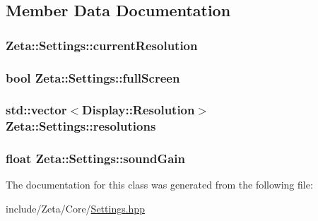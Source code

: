 \subsection{Member Data Documentation}
\hypertarget{classZeta_1_1Settings_a48d7642ab9f41200a04b8fa87df6bd21}{
\subsubsection[{current\+Resolution}]{ Zeta\+::\+Settings\+::current\+Resolution\hspace{0.3cm}{\ttfamily [private]}}}\label{classZeta_1_1Settings_a48d7642ab9f41200a04b8fa87df6bd21}
\hypertarget{classZeta_1_1Settings_a9ab00f9bfa9b51a82e362109c7c98809}{
\subsubsection[{full\+Screen}]{\setlength{\rightskip}{0pt plus 5cm}bool Zeta\+::\+Settings\+::full\+Screen\hspace{0.3cm}{\ttfamily [private]}}}\label{classZeta_1_1Settings_a9ab00f9bfa9b51a82e362109c7c98809}
\hypertarget{classZeta_1_1Settings_a4edd784ac3f38ad781dc214ad776e87e}{
\subsubsection[{resolutions}]{\setlength{\rightskip}{0pt plus 5cm}std\+::vector$<${\bf Display\+::\+Resolution}$>$ Zeta\+::\+Settings\+::resolutions\hspace{0.3cm}{\ttfamily [private]}}}\label{classZeta_1_1Settings_a4edd784ac3f38ad781dc214ad776e87e}
\hypertarget{classZeta_1_1Settings_a32644610eb7d398eb5b679937bd270b3}{
\subsubsection[{sound\+Gain}]{\setlength{\rightskip}{0pt plus 5cm}float Zeta\+::\+Settings\+::sound\+Gain\hspace{0.3cm}{\ttfamily [private]}}}\label{classZeta_1_1Settings_a32644610eb7d398eb5b679937bd270b3}


The documentation for this class was generated from the following file\+:\begin{DoxyCompactItemize}
\item 
include/\+Zeta/\+Core/\hyperlink{Settings_8hpp}{Settings.\+hpp}\end{DoxyCompactItemize}
